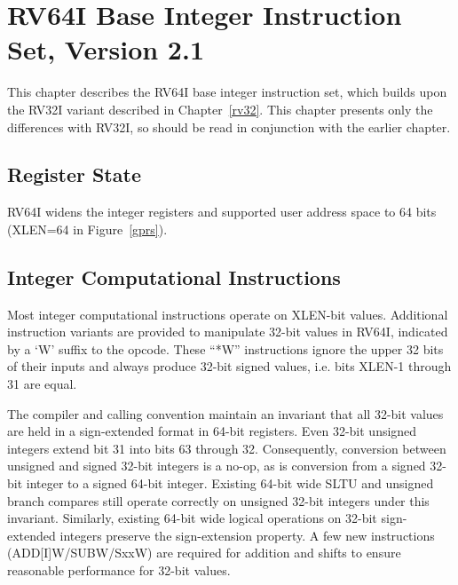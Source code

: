 \chapter{RV64I Base Integer Instruction Set, Version 2.1}
\label{rv64}

This chapter describes the RV64I base integer instruction set, which
builds upon the RV32I variant described in Chapter~\ref{rv32}.  This
chapter presents only the differences with RV32I, so should be read in
conjunction with the earlier chapter.

\section{Register State}

RV64I widens the integer registers and supported user address space to
64 bits (XLEN=64 in Figure~\ref{gprs}).

\section{Integer Computational Instructions}

Most integer computational instructions operate on XLEN-bit values.
Additional instruction variants are provided to manipulate 32-bit
values in RV64I, indicated by a `W' suffix to the opcode.  These
``*W'' instructions ignore the upper 32 bits of their inputs and
always produce 32-bit signed values, i.e. bits XLEN-1 through 31 are
equal.

\begin{commentary}
The compiler and calling convention maintain an invariant that all 32-bit
values are held in a sign-extended format in 64-bit registers.  Even 32-bit
unsigned integers extend bit 31 into bits 63 through 32.  Consequently,
conversion between unsigned and signed 32-bit integers is a no-op,
as is conversion from a signed 32-bit integer to a signed 64-bit
integer.  Existing 64-bit wide SLTU and unsigned branch compares still operate
correctly on unsigned 32-bit integers under this invariant.  Similarly,
existing 64-bit wide logical operations on 32-bit sign-extended integers
preserve the sign-extension property.  A few new instructions
(ADD[I]W/SUBW/SxxW) are required for addition and shifts to ensure reasonable
performance for 32-bit values.
\end{commentary}

\newpage
